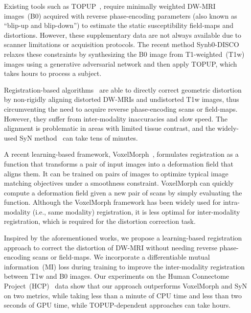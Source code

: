 \documentclass[]{spie}  %
\begin{document}
Existing tools such as TOPUP~\cite{andersson2003correctShort}, require minimally weighted DW-MRI images~(B0) acquired with reverse phase-encoding parameters (also known as ``blip-up and blip-down'') to estimate the static susceptibility field-maps and distortions. However, these supplementary data are not always available due to scanner limitations or acquisition protocols. The recent method Synb0-DISCO~\cite{schilling2020distortionShort} relaxes these constraints by synthesizing the B0 image from T1-weighted~(T1w) images using a generative adversarial network and then apply TOPUP, which takes hours to process a subject. 

Registration-based algorithms~\cite{wu2008comparisonShort, smith2004advancesShort} are able to directly correct geometric distortion by non-rigidly aligning distorted DW-MRIs and undistorted T1w images, thus circumventing the need to acquire reverse phase-encoding scans or field-maps. However, they suffer from inter-modality inaccuracies and slow speed. The alignment is problematic in areas with limited tissue contrast, and the widely-used SyN method~\cite{ avants2011reproducibleShort} can take tens of minutes. %


A recent learning-based framework, VoxelMorph~\cite{balakrishnan2019voxelmorphShort}, formulates registration as a function that transforms a pair of input images into a deformation field that aligns them. It can be trained on pairs of images to optimize typical image matching objectives under a smoothness constraint. VoxelMorph can quickly compute a deformation field given a new pair of scans by simply evaluating the function. Although the VoxelMorph framework has been widely used for intra-modality (i.e., same modality) registration, it is less optimal for inter-modality registration, which is required for the distortion correction task. 

Inspired by the aforementioned works, we propose a learning-based registration approach to correct the distortion of DW-MRI without needing reverse phase-encoding scans or field-maps. We incorporate a differentiable mutual information~(MI) loss during training to improve the inter-modality registration between T1w and B0 images. Our experiments on the Human Connectome Project~(HCP)~\cite{van2013wuShort} data show that our approach outperforms VoxelMorph and SyN on two metrics, while taking less than a minute of CPU time and less than two seconds of GPU time, while TOPUP-dependent approaches can take hours.  
 
\end{document}
